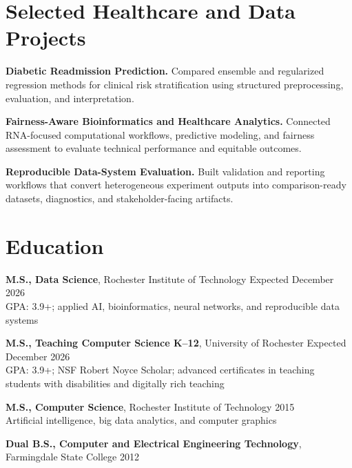 \documentclass[10pt,letterpaper]{article}
\begin{document}
\section*{Selected Healthcare and Data Projects}
\textbf{Diabetic Readmission Prediction.}
Compared ensemble and regularized regression methods for clinical risk
stratification using structured preprocessing, evaluation, and interpretation.

\textbf{Fairness-Aware Bioinformatics and Healthcare Analytics.}
Connected RNA-focused computational workflows, predictive modeling, and
fairness assessment to evaluate technical performance and equitable outcomes.

\textbf{Reproducible Data-System Evaluation.}
Built validation and reporting workflows that convert heterogeneous experiment
outputs into comparison-ready datasets, diagnostics, and stakeholder-facing
artifacts.

\section*{Education}
\textbf{M.S., Data Science}, Rochester Institute of Technology
\hfill Expected December 2026\\
GPA: 3.9+; applied AI, bioinformatics, neural networks, and reproducible data systems

\textbf{M.S., Teaching Computer Science K--12}, University of Rochester
\hfill Expected December 2026\\
GPA: 3.9+; NSF Robert Noyce Scholar; advanced certificates in teaching students
with disabilities and digitally rich teaching

\textbf{M.S., Computer Science}, Rochester Institute of Technology
\hfill 2015\\
Artificial intelligence, big data analytics, and computer graphics

\textbf{Dual B.S., Computer and Electrical Engineering Technology}, Farmingdale State College
\hfill 2012
\end{document}
